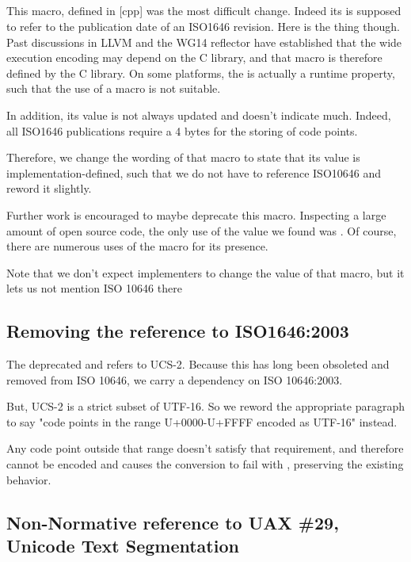 \documentclass{wg21}
\begin{document}
\subsection{}

This macro, defined in [cpp] was the most difficult change.
Indeed its  is supposed to refer to the publication date of an ISO1646 revision.
Here is the thing though.
Past discussions in LLVM and the WG14 reflector have established that the wide execution encoding
may depend on the C library, and that macro is therefore defined by the C library.
On some platforms, the  is actually a runtime property, such that the use of a macro
is not suitable.

In addition, its value is not always updated and doesn't indicate much.
Indeed, all ISO1646 publications require a 4 bytes  for the storing of code points.

Therefore, we change the wording of that macro to state that its value is implementation-defined,
such that we do not have to reference ISO10646 and reword it slightly.

Further work is encouraged to maybe deprecate this macro.
Inspecting a large amount of open source code, the only use of the value we found was .
Of course, there are numerous uses of the macro for its presence.

Note that we don't expect implementers to change the value of that macro, but it lets us not mention ISO 10646 there

\subsection{Removing the reference to ISO1646:2003}

The deprecated  and  refers to UCS-2.
Because this has long been obsoleted and removed from ISO 10646, we carry a dependency on ISO 10646:2003.

But, UCS-2 is a strict subset of UTF-16. So we reword the appropriate paragraph to say
"code points in the range U+0000-U+FFFF encoded as UTF-16" instead.

Any code point outside that range doesn't satisfy that requirement, and therefore cannot be encoded and causes the conversion to fail with , preserving the existing behavior.

\subsection{Non-Normative reference to UAX \#29, Unicode Text Segmentation}
\end{document}
